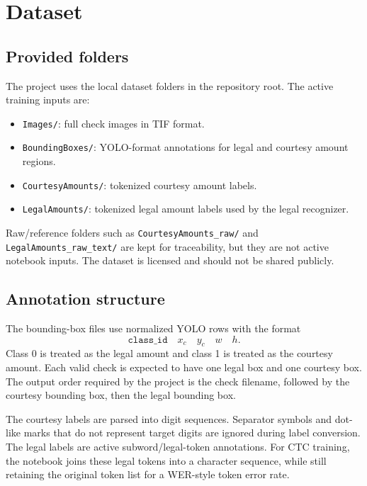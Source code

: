 \documentclass{article}
\begin{document}
\section{Dataset}

\subsection{Provided folders}

The project uses the local dataset folders in the repository root. The active training inputs are:

\begin{itemize}
  \item \texttt{Images/}: full check images in TIF format.
  \item \texttt{BoundingBoxes/}: YOLO-format annotations for legal and courtesy amount regions.
  \item \texttt{CourtesyAmounts/}: tokenized courtesy amount labels.
  \item \texttt{LegalAmounts/}: tokenized legal amount labels used by the legal recognizer.
\end{itemize}

Raw/reference folders such as \texttt{CourtesyAmounts\_raw/} and \texttt{LegalAmounts\_raw\_text/} are kept for traceability, but they are not active notebook inputs. The dataset is licensed and should not be shared publicly.

\subsection{Annotation structure}

The bounding-box files use normalized YOLO rows with the format
\[
  \texttt{class\_id} \quad x_c \quad y_c \quad w \quad h .
\]
Class 0 is treated as the legal amount and class 1 is treated as the courtesy amount. Each valid check is expected to have one legal box and one courtesy box. The output order required by the project is the check filename, followed by the courtesy bounding box, then the legal bounding box.

The courtesy labels are parsed into digit sequences. Separator symbols and dot-like marks that do not represent target digits are ignored during label conversion. The legal labels are active subword/legal-token annotations. For CTC training, the notebook joins these legal tokens into a character sequence, while still retaining the original token list for a WER-style token error rate.
\end{document}
